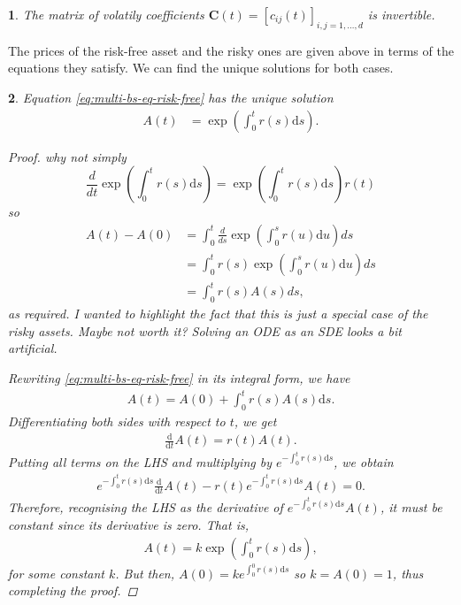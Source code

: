 \documentclass[english]{article}
\newcommand{\comment}[1]{\color{blue}#1\color{black}}
\newcommand{\tomcomment}[1]{\color{orange}#1\color{black}}
\numberwithin{equation}{section}
\numberwithin{figure}{section}
\theoremstyle{bolddescit}
\newtheorem{theorem}{\protect\theoremname}[section]
\theoremstyle{definition}
\theoremstyle{definition}
\theoremstyle{plain}
\theoremstyle{plain}
\theoremstyle{bolddesc}
\newtheorem{assumption}[theorem]{\protect\assumptionname}
\theoremstyle{plain}
\theoremstyle{remark}
\providecommand{\assumptionname}{Assumption}
\providecommand{\theoremname}{Theorem}
\begin{document}
\begin{assumption}\label{ass:vol-matrix-invertible}
  The matrix of volatily coefficients $\mathbf{C}(t)= [c_{ij}(t)]_{i,j=1,\ldots,d}$ is invertible.
\end{assumption}

The prices of the risk-free asset and the risky ones are given above in terms of the equations they satisfy. We can find the unique solutions for both cases.

\begin{theorem}\label{thm:bs-solution-risk-free}
  Equation \eqref{eq:multi-bs-eq-risk-free} has the unique solution
  \begin{align*}
    A(t) &= \exp \left( \int_0^t r(s) \mathrm{d}s \right).
  \end{align*}

  \begin{proof}
\comment{why not simply
\[\frac{d}{dt} \exp \left( \int_0^t r(s) \mathrm{d}s \right) = \exp \left( \int_0^t r(s) \mathrm{d}s \right) r(t)  \]
so
\begin{align*}
A(t)-A(0) & =  \int_0^t \frac{d}{ds} \exp \left( \int_0^s r(u) \mathrm{d}u \right) ds \\
& =  \int_0^t r(s)\exp \left( \int_0^s r(u) \mathrm{d}u \right) ds \\
& = \int_0^t r(s)A(s) ds,
\end{align*}
as required.
}
\tomcomment{I wanted to highlight the fact that this is just a special case of the risky assets. Maybe not worth it?}
\comment{Solving an ODE as an SDE looks a bit artificial.}

    Rewriting \eqref{eq:multi-bs-eq-risk-free} in its integral form, we have
    \begin{align*}
      A(t) = A(0) + \int_0^t r(s) A(s) \mathrm{d}s.
    \end{align*}
    Differentiating both sides with respect to $t$, we get
    \begin{align*}
      \frac{\mathrm{d}}{\mathrm{d}t}A(t) = r(t) A(t).
    \end{align*}
    Putting all terms on the LHS and multiplying by $e^{-\int_0^t r(s) \mathrm{d}s}$, we obtain
    \begin{align*}
      e^{-\int_0^t r(s) \mathrm{d}s} \frac{\mathrm{d}}{\mathrm{d}t}A(t) - r(t) e^{-\int_0^t r(s) \mathrm{d}s} A(t) = 0.
    \end{align*}
    Therefore, recognising the LHS as the derivative of $e^{-\int_0^t r(s) \mathrm{d}s} A(t)$, it must be constant since its derivative is zero. That is,
    \begin{align*}
      A(t) = k \exp\left(\int_0^t r(s) \mathrm{d}s\right),
    \end{align*}
    for some constant $k$. But then, $A(0) = k e^{\int_0^0 r(s) \mathrm{d}s}$ so $k = A(0) = 1$, thus completing the proof.
  \end{proof}
\end{theorem}
\end{document}
